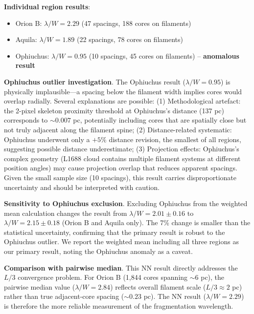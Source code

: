 \documentclass[twocolumn,usenatbib]{mnras}
\begin{document}
\noindent\textbf{Individual region results}:
\begin{itemize}
\item Orion B: $\lambda/W = 2.29$ (47 spacings, 188 cores on filaments)
\item Aquila: $\lambda/W = 1.89$ (22 spacings, 78 cores on filaments)
\item Ophiuchus: $\lambda/W = 0.95$ (10 spacings, 45 cores on filaments) -- \textbf{anomalous result}
\end{itemize}

\noindent\textbf{Ophiuchus outlier investigation}. The Ophiuchus result ($\lambda/W = 0.95$) is physically implausible---a spacing below the filament width implies cores would overlap radially. Several explanations are possible: (1) Methodological artefact: the 2-pixel skeleton proximity threshold at Ophiuchus's distance (137 pc) corresponds to $\sim0.007$ pc, potentially including cores that are spatially close but not truly adjacent along the filament spine; (2) Distance-related systematic: Ophiuchus underwent only a $+5\%$ distance revision, the smallest of all regions, suggesting possible distance underestimate; (3) Projection effects: Ophiuchus's complex geometry (L1688 cloud contains multiple filament systems at different position angles) may cause projection overlap that reduces apparent spacings. Given the small sample size (10 spacings), this result carries disproportionate uncertainty and should be interpreted with caution.

\noindent\textbf{Sensitivity to Ophiuchus exclusion}. Excluding Ophiuchus from the weighted mean calculation changes the result from $\lambda/W = 2.01 \pm 0.16$ to $\lambda/W = 2.15 \pm 0.18$ (Orion B and Aquila only). The 7\% change is smaller than the statistical uncertainty, confirming that the primary result is robust to the Ophiuchus outlier. We report the weighted mean including all three regions as our primary result, noting the Ophiuchus anomaly as a caveat.

\noindent\textbf{Comparison with pairwise median}. This NN result directly addresses the $L/3$ convergence problem. For Orion B (1,844 cores spanning $\sim6$ pc), the pairwise median value ($\lambda/W = 2.84$) reflects overall filament scale ($L/3 \approx 2$ pc) rather than true adjacent-core spacing ($\sim0.23$ pc). The NN result ($\lambda/W = 2.29$) is therefore the more reliable measurement of the fragmentation wavelength.
\end{document}
